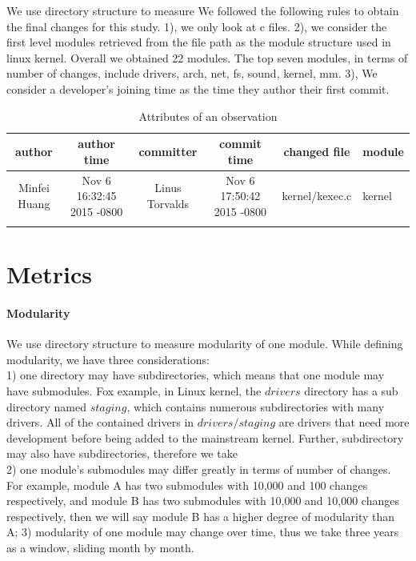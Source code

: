 \documentclass{sig-alternate-05-2015}
\begin{document}
We use directory structure to measure 
We followed the following rules to obtain the final changes for this study.
1), we only look at c files.
2), we consider the first level modules retrieved from the file path 
as the module structure used in linux kernel. Overall we obtained 22 modules.
The top seven modules, in terms of number of changes, include drivers, arch, net, fs, sound, kernel, mm.
3), We consider a developer's joining time as the time they author their first commit.

\begin{table}
\centering
\caption{Attributes of an observation}
\begin{tabular}{c|c|c|c|c|l} \hline
author & author time & committer & commit time & changed file & module\\ \hline
 Minfei Huang & Nov 6 16:32:45 2015 -0800 & Linus Torvalds & Nov 6 17:50:42 2015 -0800 & kernel/kexec.c &kernel\\ \hline
\label{tab:data}
\end{tabular}
\end{table}


\section{Metrics}
\paragraph{Modularity}
We use directory structure to measure modularity of one module. While defining modularity, we have three considerations: \\
1) one directory may have subdirectories, which means that one module may have submodules. Fox example, in Linux kernel, the $drivers$ directory has a sub directory named $staging$, 
which contains numerous subdirectories with many drivers. All of the contained drivers in $drivers/staging$ are drivers that need more development before being added to the mainstream kernel. Further, subdirectory may also have subdirectories, therefore we take\\
2) one module's submodules may differ greatly in terms of number of changes. For example, module A has two submodules with 10,000 and 100 changes respectively, and module B has two submodules with 10,000 and 10,000 changes respectively, then we will say module B has a higher degree of modularity than A;
3) modularity of one module may change over time, thus we take three years as a window, sliding month by month.\\
\end{document}
